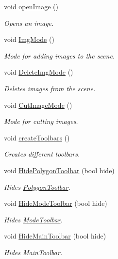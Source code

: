\begin{DoxyCompactItemize}
void \mbox{\hyperlink{classGUI_a925c89bd7b32ccc8d726063ed8076f8f}{open\+Image}} ()
\begin{DoxyCompactList}\small\item\em Opens an image. \end{DoxyCompactList}\item 
void \mbox{\hyperlink{classGUI_a5281fa4256d3ff14df9a95c1c6613bb2}{Img\+Mode}} ()
\begin{DoxyCompactList}\small\item\em Mode for adding images to the scene. \end{DoxyCompactList}\item 
void \mbox{\hyperlink{classGUI_a453b758a292b4a0e6f52f25b1bb2de77}{Delete\+Img\+Mode}} ()
\begin{DoxyCompactList}\small\item\em Deletes images from the scene. \end{DoxyCompactList}\item 
void \mbox{\hyperlink{classGUI_ae8acfcce2ea4da241c920076b72f1c93}{Cut\+Image\+Mode}} ()
\begin{DoxyCompactList}\small\item\em Mode for cutting images. \end{DoxyCompactList}\item 
void \mbox{\hyperlink{classGUI_a26cdc4a989f3637301f0afb9cc5e23b0}{create\+Toolbars}} ()
\begin{DoxyCompactList}\small\item\em Creates different toolbars. \end{DoxyCompactList}\item 
void \mbox{\hyperlink{classGUI_aaf633cd0904e4c3627c21219f330c177}{Hide\+Polygon\+Toolbar}} (bool hide)
\begin{DoxyCompactList}\small\item\em Hides \mbox{\hyperlink{structPolygonToolbar}{Polygon\+Toolbar}}. \end{DoxyCompactList}\item 
void \mbox{\hyperlink{classGUI_a9517c0ad1e4c2b39faab8050f8133151}{Hide\+Mode\+Toolbar}} (bool hide)
\begin{DoxyCompactList}\small\item\em Hides \mbox{\hyperlink{structModeToolbar}{Mode\+Toolbar}}. \end{DoxyCompactList}\item 
void \mbox{\hyperlink{classGUI_aa115b0163bfbf518dd201f4f02476b75}{Hide\+Main\+Toolbar}} (bool hide)
\begin{DoxyCompactList}\small\item\em Hides Main\+Toolbar. \end{DoxyCompactList}\item 

\end{DoxyCompactItemize}
